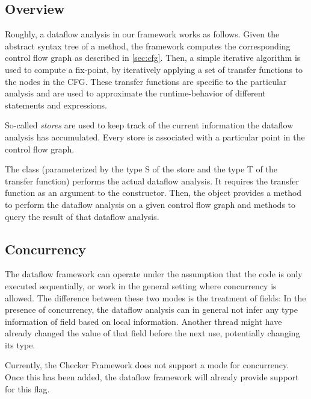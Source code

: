 \subsection{Overview}

Roughly, a dataflow analysis in our framework works as follows. Given the abstract syntax
tree of a method, the framework computes the corresponding control flow graph as
described in \autoref{sec:cfg}. Then, a simple iterative algorithm is used to compute
a fix-point, by iteratively applying a set of transfer functions to the nodes in the
CFG. These transfer functions are specific to the particular analysis and are used
to approximate the runtime-behavior of different statements and expressions.

So-called \emph{stores} are used to keep track of the current information the dataflow
analysis has accumulated. Every store is associated with a particular point in the
control flow graph.

The class  (parameterized by the type \code S of the store and the type \code T of the
transfer function) performs the actual dataflow analysis. It requires the transfer function
as an argument to the constructor. Then, the object provides a method to perform the dataflow
analysis on a given control flow graph and methods to query the result of that dataflow analysis.





\subsection{Concurrency}

The dataflow framework can operate under the assumption that the code is only
executed sequentially, or work in the general setting where concurrency is allowed.
The difference between these two modes is the treatment of fields:  In the
presence of concurrency, the dataflow analysis can in general not infer any type information
of field based on local information.  Another thread might have already changed the value
of that field before the next use, potentially changing its type.

\begin{workinprogress}
    Currently, the Checker Framework does not support a mode for concurrency.  Once this
    has been added, the dataflow framework will already provide support for this flag.
\end{workinprogress}

